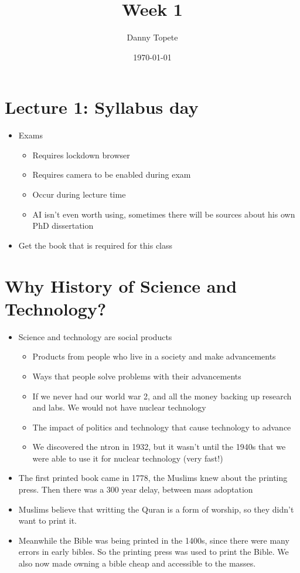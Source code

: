\documentclass{article}
\title{Week 1}
\author{Danny Topete}
\date{\today}
\begin{document}
\maketitle

\section{Lecture 1: Syllabus day}
\begin{itemize}
  \item Exams
    \begin{itemize}
      \item Requires lockdown browser
      \item Requires camera to be enabled during exam
      \item Occur during lecture time
      \item AI isn't even worth using, sometimes
        there will be sources about his own PhD dissertation
    \end{itemize}
  \item Get the book that is required for this class
\end{itemize}

\section*{Why History of Science and Technology?}
\begin{itemize}
  \item Science and technology are social products
    \begin{itemize}
      \item Products from people who live in a society and make
        advancements
      \item Ways that people solve problems with their advancements
      \item If we never had our world war 2, and all the
        money backing up research and labs.
        We would not have nuclear technology
      \item The impact of politics and technology that
        cause technology to advance
      \item We discovered the ntron in 1932, but
        it wasn't until the 1940s that we were able to
        use it for nuclear technology (very fast!)
    \end{itemize}
  \item The first printed book came in 1778,
    the Muslims knew about the printing press.
    Then there was a 300 year delay, between mass adoptation
  \item Muslims believe that writting the Quran
    is a form of worship, so they didn't want to
    print it.
  \item Meanwhile the Bible was being printed
    in the 1400s, since there were many errors in early bibles.
    So the printing press was used to print the Bible.
    We also now made owning a bible cheap and
    accessible to the masses.
\end{itemize}
\end{document}
